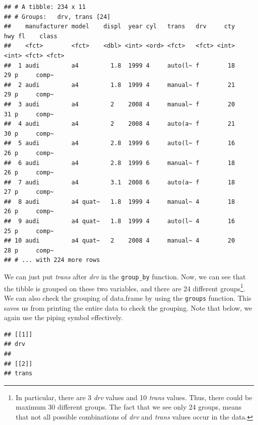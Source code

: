 \documentclass[]{tufte-book}
\newenvironment{Shaded}{}{}
\newcommand{\KeywordTok}[1]{\textcolor[rgb]{0.00,0.44,0.13}{\textbf{#1}}}
\newcommand{\NormalTok}[1]{#1}
\newcommand{\OperatorTok}[1]{\textcolor[rgb]{0.40,0.40,0.40}{#1}}
\newcommand{\StringTok}[1]{\textcolor[rgb]{0.25,0.44,0.63}{#1}}
\begin{document}
\begin{verbatim}
## # A tibble: 234 x 11
## # Groups:   drv, trans [24]
##    manufacturer model    displ  year cyl   trans   drv     cty   hwy fl    class
##    <fct>        <fct>    <dbl> <int> <ord> <fct>   <fct> <int> <int> <fct> <fct>
##  1 audi         a4         1.8  1999 4     auto(l~ f        18    29 p     comp~
##  2 audi         a4         1.8  1999 4     manual~ f        21    29 p     comp~
##  3 audi         a4         2    2008 4     manual~ f        20    31 p     comp~
##  4 audi         a4         2    2008 4     auto(a~ f        21    30 p     comp~
##  5 audi         a4         2.8  1999 6     auto(l~ f        16    26 p     comp~
##  6 audi         a4         2.8  1999 6     manual~ f        18    26 p     comp~
##  7 audi         a4         3.1  2008 6     auto(a~ f        18    27 p     comp~
##  8 audi         a4 quat~   1.8  1999 4     manual~ 4        18    26 p     comp~
##  9 audi         a4 quat~   1.8  1999 4     auto(l~ 4        16    25 p     comp~
## 10 audi         a4 quat~   2    2008 4     manual~ 4        20    28 p     comp~
## # ... with 224 more rows
\end{verbatim}

We can just put \emph{trans} after \emph{drv} in the \texttt{group\_by} function. Now, we can see that the tibble is grouped on these two variables, and there are 24 different groups\footnote{In particular, there are 3 \emph{drv} values and 10 \emph{trans} values. Thus, there could be maximum 30 different groups. The fact that we see only 24 groups, means that not all possible combinations of \emph{drv} and \emph{trans} values occur in the data.}. We can also check the grouping of data.frame by using the \texttt{groups} function. This saves us from printing the entire data to check the grouping. Note that below, we again use the piping symbol effectively.

\begin{Shaded}
\end{Shaded}

\begin{verbatim}
## [[1]]
## drv
## 
## [[2]]
## trans
\end{verbatim}
\end{document}
